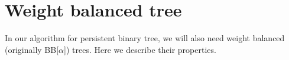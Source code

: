 \section{Weight balanced tree}

In our algorithm for persistent binary tree, we will also need weight balanced (originally BB[$\alpha$]) trees. Here we describe their properties.
